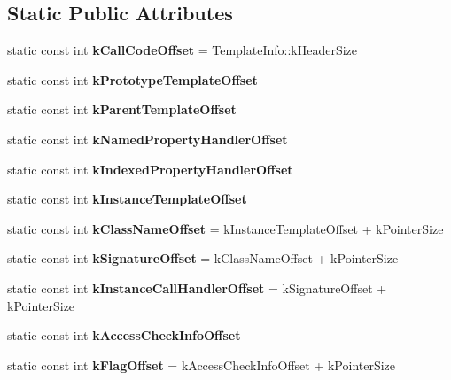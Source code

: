 \subsection*{Static Public Attributes}
\begin{DoxyCompactItemize}
\item 
static const int {\bfseries k\+Call\+Code\+Offset} = Template\+Info\+::k\+Header\+Size\hypertarget{classv8_1_1internal_1_1_function_template_info_a64955d670817f4c46b8418a5e142093b}{}\label{classv8_1_1internal_1_1_function_template_info_a64955d670817f4c46b8418a5e142093b}

\item 
static const int {\bfseries k\+Prototype\+Template\+Offset}
\item 
static const int {\bfseries k\+Parent\+Template\+Offset}
\item 
static const int {\bfseries k\+Named\+Property\+Handler\+Offset}
\item 
static const int {\bfseries k\+Indexed\+Property\+Handler\+Offset}
\item 
static const int {\bfseries k\+Instance\+Template\+Offset}
\item 
static const int {\bfseries k\+Class\+Name\+Offset} = k\+Instance\+Template\+Offset + k\+Pointer\+Size\hypertarget{classv8_1_1internal_1_1_function_template_info_a7599e8be26fa10816008af1ca12a59c6}{}\label{classv8_1_1internal_1_1_function_template_info_a7599e8be26fa10816008af1ca12a59c6}

\item 
static const int {\bfseries k\+Signature\+Offset} = k\+Class\+Name\+Offset + k\+Pointer\+Size\hypertarget{classv8_1_1internal_1_1_function_template_info_a46ed1c6bf24edb069411dcd0a0773047}{}\label{classv8_1_1internal_1_1_function_template_info_a46ed1c6bf24edb069411dcd0a0773047}

\item 
static const int {\bfseries k\+Instance\+Call\+Handler\+Offset} = k\+Signature\+Offset + k\+Pointer\+Size\hypertarget{classv8_1_1internal_1_1_function_template_info_a56173d05992d27484b5782160f795588}{}\label{classv8_1_1internal_1_1_function_template_info_a56173d05992d27484b5782160f795588}

\item 
static const int {\bfseries k\+Access\+Check\+Info\+Offset}
\item 
static const int {\bfseries k\+Flag\+Offset} = k\+Access\+Check\+Info\+Offset + k\+Pointer\+Size\hypertarget{classv8_1_1internal_1_1_function_template_info_a9287109e0a19b92dd8ddcbd3e5d8aa89}{}\label{classv8_1_1internal_1_1_function_template_info_a9287109e0a19b92dd8ddcbd3e5d8aa89}


\end{DoxyCompactItemize}
